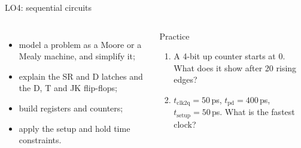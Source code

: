 \documentclass[10pt]{wosm-slides}
\begin{document}
\begin{frame}{LO4: sequential circuits}
  \begin{columns}[T, totalwidth=\textwidth]
      \begin{itemize}
        \item model a problem as a Moore or a Mealy machine, and simplify it;
        \item explain the SR and D latches and the D, T and JK flip-flops;
        \item build registers and counters;
        \item apply the setup and hold time constraints.
      \end{itemize}
      \begin{block}{Practice}
        \begin{enumerate}
          \item A 4-bit up counter starts at 0. What does it show after 20 rising
            edges?\par
          \item $t_{\mathrm{clk2q}} = 50$\,ps, $t_{\mathrm{pd}} = 400$\,ps,
            $t_{\mathrm{setup}} = 50$\,ps. What is the fastest clock?\par
        \end{enumerate}
      \end{block}
  \end{columns}
\end{frame}
\end{document}
